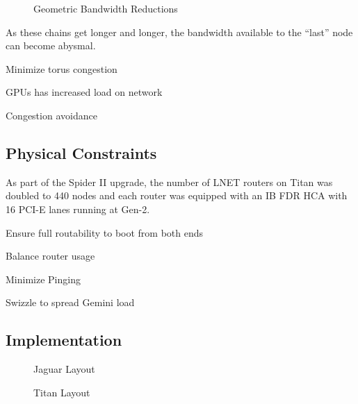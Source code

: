 \begin{figure}[h]
  \centering
  
  \caption{Geometric Bandwidth Reductions}\label{fig:geombw}
\end{figure}

As these chains get longer and longer, the bandwidth available to the ``last''
node can become abysmal.

Minimize torus congestion

GPUs has increased load on network

Congestion avoidance

\subsection{Physical Constraints}

As part of the Spider II upgrade, the number of LNET routers on Titan was
doubled to 440 nodes and each router was equipped with an IB FDR HCA with 16
PCI-E lanes running at Gen-2.

Ensure full routability to boot from both ends

Balance router usage

Minimize Pinging

Swizzle to spread Gemini load

\subsection{Implementation}

\begin{figure*}[!h]
  \newcommand{\barec}[1]{\multicolumn{1}{c}{#1}}
  \begin{center}
    
    \caption{Jaguar Layout}
    \vspace{5mm}
    
    \caption{Titan Layout}
  \end{center}
\end{figure*}
